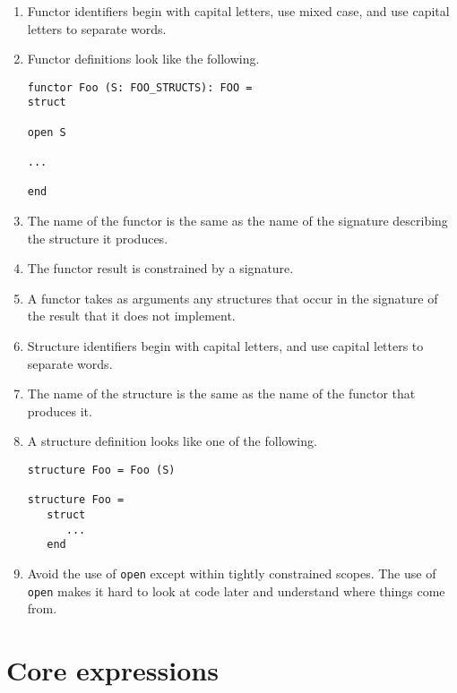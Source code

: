 \documentclass[12pt]{article}
\begin{document}
\begin{enumerate}

\item
Functor identifiers begin with capital letters, use mixed case, and use capital
letters to separate words.

\item
Functor definitions look like the following.
\begin{verbatim}
functor Foo (S: FOO_STRUCTS): FOO =
struct

open S

...

end
\end{verbatim}

\item
The name of the functor is the same as the name of the signature describing the
structure it produces.

\item
The functor result is constrained by a signature.

\item
A functor takes as arguments any structures that occur in the signature of the
result that it does not implement.

\item
Structure identifiers begin with capital letters, and use capital letters to
separate words.

\item
The name of the structure is the same as the name of the functor that produces
it.

\item
A structure definition looks like one of the following.
\begin{verbatim}
structure Foo = Foo (S)

structure Foo =
   struct
      ...
   end
\end{verbatim}

\item
Avoid the use of {\tt open} except within tightly constrained scopes.  The use
of {\tt open} makes it hard to look at code later and understand where things
come from.

\end{enumerate}


\section{Core expressions}
\end{document}
